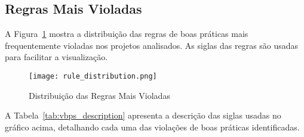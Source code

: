 \documentclass[12pt]{article}
\begin{document}
\subsection{Regras Mais Violadas}
A Figura~\ref{fig:rule_distribution} mostra a distribuição das regras de boas práticas mais frequentemente violadas nos projetos analisados. As siglas das regras são usadas para facilitar a visualização.

\begin{figure}[H]
\centering
\texttt{[image: rule\_distribution.png]}
\caption{Distribuição das Regras Mais Violadas}
\label{fig:rule_distribution}
\end{figure}

A Tabela~\ref{tab:vbps_description} apresenta a descrição das siglas usadas no gráfico acima, detalhando cada uma das violações de boas práticas identificadas.
\end{document}
